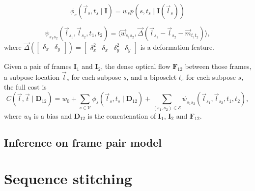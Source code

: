 \documentclass[runningheads]{llncs}
\newcommand{\mat}{\mathbf}
\begin{document}
\begin{equation}
\label{eqn:unary-cost}
\phi_s(\vec l_s, t_s \mid \mat I) = w_s p(s, t_s \mid \mat I(\vec l_s))
\end{equation}

\begin{equation}
\label{eqn:pair-cost}
\psi_{s_1 s_2}(\vec l_{s_1}, \vec l_{s_2}, t_1, t_2)
= \langle
    \vec w_{s_1 s_2},
    \vec \Delta(\vec l_{s_1} - \vec l_{s_2}  - \vec m_{t_1 t_2})
\rangle,
\end{equation}
where $\vec \Delta(\begin{bmatrix}\delta_x & \delta_y\end{bmatrix}) =
\begin{bmatrix}\delta_x^2 & \delta_x & \delta_y^2 & \delta_y\end{bmatrix}$ is a
deformation feature.

Given a pair of frames $\mat I_1$ and $\mat I_2$, the dense optical flow $\mat
F_{12}$ between those frames, a subpose location $\vec l_s$ for each subpose
$s$, and a biposelet $t_s$ for each subpose $s$, the full cost is
%
\begin{equation}
\label{eqn:full-cost}
C(\vec l, \vec t \mid \mat D_{12})
= w_0 + \sum_{s \in \mathcal V} \phi_s(\vec l_s, t_s \mid \mat D_{12})
+ \sum_{(s_1, s_2) \in \mathcal E}
    \psi_{s_1 s_2}(\vec l_{s_1}, \vec l_{s_2}, t_1, t_2),
\end{equation}
%
where $w_0$ is a bias and $\mat D_{12}$ is the concatenation of $\mat I_1$,
$\mat I_2$ and $\mat F_{12}$.

\subsection{Inference on frame pair model}

\section{Sequence stitching}

%
\end{document}
